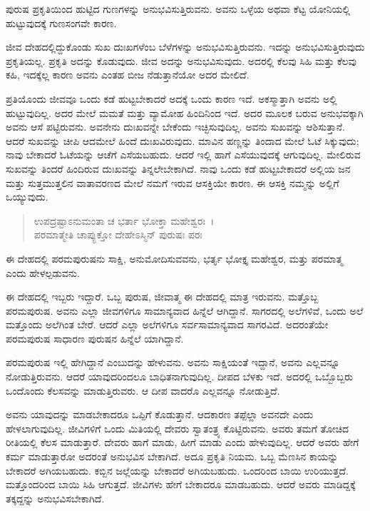{\small ಪುರುಷ ಪ್ರಕೃತಿಯಿಂದ ಹುಟ್ಟಿದ ಗುಣಗಳನ್ನು ಅನುಭವಿಸುತ್ತಿರುವನು. ಅವನು ಒಳ್ಳೆಯ ಅಥವಾ ಕೆಟ್ಟ ಯೋನಿಯಲ್ಲಿ ಹುಟ್ಟುವುದಕ್ಕೆ ಗುಣಸಂಗವೇ ಕಾರಣ.}

ಜೀವ ದೇಹದಲ್ಲಿದ್ದುಕೊಂಡು ಸುಖ ದುಃಖಗಳೆಂಬ ಬೆಳೆಗಳನ್ನು ಅನುಭವಿಸುತ್ತಿರುವನು. ಇದನ್ನು ಅನುಭವಿಸುತ್ತಿರುವುದು ಪ್ರಕೃತಿಯಲ್ಲ. ಪ್ರಕೃತಿ ಅದನ್ನು ಕೊಡುವುದು. ಜೀವ ಅದನ್ನು ಅನುಭವಿಸುವುದು. ಅದರಲ್ಲಿ ಕೆಲವು ಸಿಹಿ ಮತ್ತು ಕೆಲವು ಕಹಿ, ಇದಕ್ಕೆಲ್ಲ ಕಾರಣ ಅವನು ಎಂತಹ ಬೀಜ ನೆಡುತ್ತಾನೆಯೋ ಅದರ ಮೇಲಿದೆ.

ಪ್ರತಿಯೊಂದು ಜೀವವೂ ಒಂದು ಕಡೆ ಹುಟ್ಟಬೇಕಾದರೆ ಅದಕ್ಕೆ ಒಂದು ಕಾರಣ ಇದೆ. ಅಕಸ್ಮಾತ್ತಾಗಿ ಅವನು ಅಲ್ಲಿ ಹುಟ್ಟುವುದಿಲ್ಲ. ಅದರ ಮೇಲೆ ಮಮತೆ ಮತ್ತು ವ್ಯಾಮೋಹ ಹಿಂದಿನಿಂದ ಇದೆ. ಅದರ ಮೂಲಕ ಬರುವ ಅನುಭವಕ್ಕಾಗಿ ಅವನು ಆಸೆ ಪಟ್ಟಿರುವನು. ಅವನೇನು ದುಃಖವನ್ನೇ ಬೇಕೆಂದು ಇಚ್ಛಿಸುವುದಿಲ್ಲ. ಅವನು ಸುಖವನ್ನು ಆಶಿಸುತ್ತಾನೆ. ಆದರೆ ಸುಖವನ್ನು ಚೀಪಿ ಆದಮೇಲೆ ಹಿಂದೆ ದುಃಖವಿರುವುದು. ಮಾವಿನ ಹಣ್ಣನ್ನು ತಿಂದಾದ ಮೇಲೆ ಓಟೆ ಸಿಕ್ಕುವುದು; ನಾವು ಬೇಕಾದರೆ ಓಟೆಯನ್ನು ಆಚೆಗೆ ಎಸೆಯಬಹುದು. ಆದರೆ ಇಲ್ಲಿ ಹಾಗೆ ಎಸೆಯುವುದಕ್ಕೆ ಆಗುವುದಿಲ್ಲ. ಮೇಲಿರುವ ಸುಖವನ್ನು ತಿಂದರೆ ಹಿಂದಿರುವ ದುಃಖವನ್ನು ತಿನ್ನಲೇಬೇಕಾಗಿದೆ. ನಾವು ಒಂದು ಕಡೆ ಹುಟ್ಟಬೇಕಾದರೆ ಅಲ್ಲಿಯ ಜನ ಮತ್ತು ಸುತ್ತಮುತ್ತಲಿನ ವಾತಾವರಣದ ಮೇಲೆ ನಮಗೆ ಇರುವ ಆಸಕ್ತಿಯೇ ಕಾರಣ. ಈ ಆಸಕ್ತಿ ನಮ್ಮನ್ನು ಅಲ್ಲಿಗೆ ಒಯ್ಯುವುದು.

\begin{verse}
ಉಪದ್ರಷ್ಟಾಽನುಮಂತಾ ಚ ಭರ್ತಾ ಭೋಕ್ತಾ ಮಹೇಶ್ವರಃ~।\\ಪರಮಾತ್ಮೇತಿ ಚಾಪ್ಯುಕ್ತೋ ದೇಹೇಽಸ್ಮಿನ್ ಪುರುಷಃ ಪರಃ 
\end{verse}

{\small ಈ ದೇಹದಲ್ಲಿ ಪರಮಪುರುಷನು ಸಾಕ್ಷಿ, ಅನುಮೋದಿಸುವವನು, ಭರ್ತೃ ಭೋಕ್ತೃ ಮಹೇಶ್ವರ, ಮತ್ತು ಪರಮಾತ್ಮ ಎಂದು ಹೇಳಲ್ಪಡುವನು.}

ಈ ದೇಹದಲ್ಲಿ ಇಬ್ಬರು ಇದ್ದಾರೆ. ಒಬ್ಬ ಪುರುಷ, ಜೀವಾತ್ಮ ಈ ದೇಹದಲ್ಲಿ ಮಾತ್ರ ಇರುವನು. ಮತ್ತೊಬ್ಬ ಪರಮಪುರುಷ. ಅವನು ಎಲ್ಲಾ ಜೀವಗಳಿಗೂ ಸಾಮಾನ್ಯವಾದ ಹಿನ್ನೆಲೆ ಆಗಿದ್ದಾನೆ. ಸಾಗರದಲ್ಲಿ ಅಲೆಗಳಿವೆ, ಒಂದು ಅಲೆ ಮತ್ತೊಂದು ಅಲೆಗಿಂತ ಬೇರೆ. ಆದರೆ ಎಲ್ಲಾ ಅಲೆಗಳಿಗೂ ಸರ್ವಸಾಮಾನ್ಯವಾದ ಸಾಗರವಿದೆ. ಅದರಂತೆಯೇ ಪರಮಪುರುಷ ಸಾಧಾರಣ ಪುರುಷನ ಹಿನ್ನೆಲೆ ಯಾಗಿದ್ದಾನೆ.

ಪರಮಪುರುಷ ಇಲ್ಲಿ ಹೇಗಿದ್ದಾನೆ ಎಂಬುದನ್ನು ಹೇಳುವನು. ಅವನು ಸಾಕ್ಷಿಯಂತೆ ಇದ್ದಾನೆ, ಅವನು ಎಲ್ಲವನ್ನೂ ನೋಡುತ್ತಿರುವನು. ಆದರೆ ಯಾವುದರಿಂದಲೂ ಬಾಧಿತನಾಗುವುದಿಲ್ಲ. ದೀಪದ ಬೆಳಕು ಇದೆ. ಅದರಲ್ಲಿ ಒಬ್ಬೊಬ್ಬರು ಒಂದೊಂದು ಕೆಲಸವನ್ನು ಮಾಡುತ್ತಿರುವರು. ಆ ದೀಪ ವಾದರೊ ಎಲ್ಲವನ್ನೂ ನೋಡುತ್ತಿದೆ.

ಅವನು ಯಾವುದನ್ನು ಮಾಡಬೇಕಾದರೂ ಒಪ್ಪಿಗೆ ಕೊಡುತ್ತಾನೆ. ಆದಕಾರಣ ತಪ್ಪೆಲ್ಲಾ ಅವನದೇ ಎಂದು ಹೇಳಲಾಗುವುದಿಲ್ಲ. ಜೀವಿಗಳಿಗೆ ಒಂದು ಮಿತಿಯಲ್ಲಿ ದೇವರು ಸ್ವಾತಂತ್ರ್ಯ ಕೊಟ್ಟಿರುವನು. ಅವರು ತಮಗೆ ತೋಚಿದ ರೀತಿಯಲ್ಲಿ ಕೆಲಸ ಮಾಡುತ್ತಾರೆ. ದೇವರು ಹಾಗೆ ಮಾಡು, ಹೀಗೆ ಮಾಡು ಎಂದು ಹೇಳುವುದಿಲ್ಲ. ಆದರೆ ಅವರು ಹೇಗೆ ಕರ್ಮ ಮಾಡುತ್ತಾರೋ ಅದರಂತೆ ಅನುಭವಿಸ ಬೇಕಾಗಿದೆ. ಅದೂ ಪ್ರಕೃತಿ ನಿಯಮ. ಒಬ್ಬ ಮೆಣಸಿನ ಕಾಯನ್ನು ಬೇಕಾದರೆ ಅಗಿಯಬಹುದು. ಕಬ್ಬಿನ ಜಲ್ಲೆಯನ್ನು ಬೇಕಾದರೆ ಅಗಿಯಬಹುದು. ಒಂದರಿಂದ ಬಾಯಿ ಉರಿಯುತ್ತದೆ. ಮತ್ತೊಂದರಿಂದ ಬಾಯಿ ಸಿಹಿ ಆಗುತ್ತದೆ. ಜೀವಿಗಳು ಹೇಗೆ ಬೇಕಾದರೂ ಮಾಡಬಹುದು. ಆದರೆ ಅವರು ಮಾಡಿದ್ದಕ್ಕೆ ತಕ್ಕದ್ದನ್ನು ಅನುಭವಿಸಬೇಕಾಗಿದೆ.

